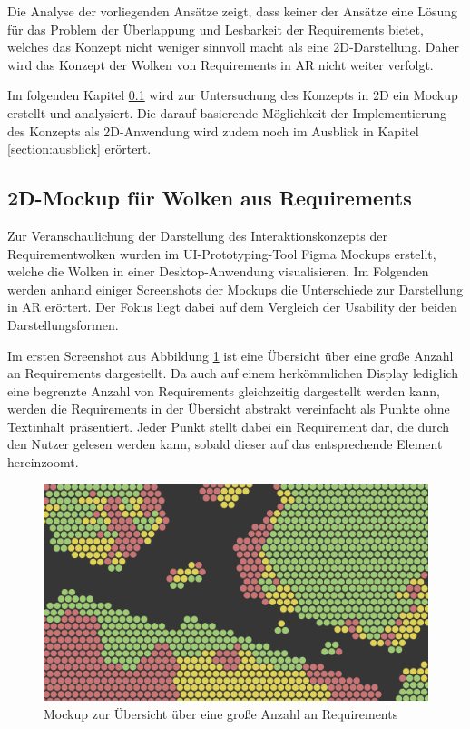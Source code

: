 Die Analyse der vorliegenden Ansätze zeigt, dass keiner der Ansätze eine Lösung für das Problem der Überlappung und Lesbarkeit der Requirements bietet, welches das Konzept nicht weniger sinnvoll macht als eine 2D-Darstellung.
Daher wird das Konzept der Wolken von Requirements in AR nicht weiter verfolgt.

Im folgenden Kapitel \ref{section:2d} wird zur Untersuchung des Konzepts in 2D ein Mockup erstellt und analysiert.
Die darauf basierende Möglichkeit der Implementierung des Konzepts als 2D-Anwendung wird zudem noch im Ausblick in Kapitel \ref{section:ausblick} erörtert.

\newpage

\subsection{2D-Mockup für Wolken aus Requirements}
\label{section:2d}

Zur Veranschaulichung der Darstellung des Interaktionskonzepts der Requirementwolken wurden im UI-Prototyping-Tool Figma Mockups erstellt, welche die Wolken in einer Desktop-Anwendung visualisieren.
Im Folgenden werden anhand einiger Screenshots der Mockups die Unterschiede zur Darstellung in AR erörtert.
Der Fokus liegt dabei auf dem Vergleich der Usability der beiden Darstellungsformen.


Im ersten Screenshot aus Abbildung \ref{fig:wolken-2d-1} ist eine Übersicht über eine große Anzahl an Requirements dargestellt.
Da auch auf einem herkömmlichen Display lediglich eine begrenzte Anzahl von Requirements gleichzeitig dargestellt werden kann, werden die Requirements in der Übersicht abstrakt vereinfacht als Punkte ohne Textinhalt präsentiert. 
Jeder Punkt stellt dabei ein Requirement dar, die durch den Nutzer gelesen werden kann, sobald dieser auf das entsprechende Element hereinzoomt.

\begin{figure}[H]
    \centering
    \includegraphics[width=1\textwidth]{images/FigmaWolkenOverview.png}
    \caption{Mockup zur Übersicht über eine große Anzahl an Requirements}
    \label{fig:wolken-2d-1}
\end{figure}

